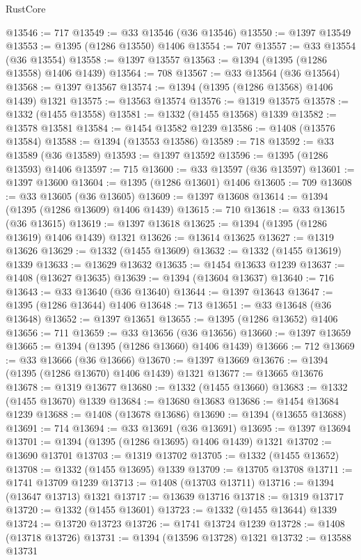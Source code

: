\begin{lexlean}{RustCore}
\begin{coremodule}
@13546 := 717
@13549 := @33 @13546 (@36 @13546)
@13550 := @1397 @13549
@13553 := @1395 (@1286 @13550) @1406
@13554 := 707
@13557 := @33 @13554 (@36 @13554)
@13558 := @1397 @13557
@13563 := @1394 (@1395 (@1286 @13558) @1406 @1439)
@13564 := 708
@13567 := @33 @13564 (@36 @13564)
@13568 := @1397 @13567
@13574 := @1394 (@1395 (@1286 @13568) @1406 @1439) @1321
@13575 := @13563 @13574
@13576 := @1319 @13575
@13578 := @1332 (@1455 @13558)
@13581 := @1332 (@1455 @13568) @1339
@13582 := @13578 @13581
@13584 := @1454 @13582 @1239
@13586 := @1408 (@13576 @13584)
@13588 := @1394 (@13553 @13586)
@13589 := 718
@13592 := @33 @13589 (@36 @13589)
@13593 := @1397 @13592
@13596 := @1395 (@1286 @13593) @1406
@13597 := 715
@13600 := @33 @13597 (@36 @13597)
@13601 := @1397 @13600
@13604 := @1395 (@1286 @13601) @1406
@13605 := 709
@13608 := @33 @13605 (@36 @13605)
@13609 := @1397 @13608
@13614 := @1394 (@1395 (@1286 @13609) @1406 @1439)
@13615 := 710
@13618 := @33 @13615 (@36 @13615)
@13619 := @1397 @13618
@13625 := @1394 (@1395 (@1286 @13619) @1406 @1439) @1321
@13626 := @13614 @13625
@13627 := @1319 @13626
@13629 := @1332 (@1455 @13609)
@13632 := @1332 (@1455 @13619) @1339
@13633 := @13629 @13632
@13635 := @1454 @13633 @1239
@13637 := @1408 (@13627 @13635)
@13639 := @1394 (@13604 @13637)
@13640 := 716
@13643 := @33 @13640 (@36 @13640)
@13644 := @1397 @13643
@13647 := @1395 (@1286 @13644) @1406
@13648 := 713
@13651 := @33 @13648 (@36 @13648)
@13652 := @1397 @13651
@13655 := @1395 (@1286 @13652) @1406
@13656 := 711
@13659 := @33 @13656 (@36 @13656)
@13660 := @1397 @13659
@13665 := @1394 (@1395 (@1286 @13660) @1406 @1439)
@13666 := 712
@13669 := @33 @13666 (@36 @13666)
@13670 := @1397 @13669
@13676 := @1394 (@1395 (@1286 @13670) @1406 @1439) @1321
@13677 := @13665 @13676
@13678 := @1319 @13677
@13680 := @1332 (@1455 @13660)
@13683 := @1332 (@1455 @13670) @1339
@13684 := @13680 @13683
@13686 := @1454 @13684 @1239
@13688 := @1408 (@13678 @13686)
@13690 := @1394 (@13655 @13688)
@13691 := 714
@13694 := @33 @13691 (@36 @13691)
@13695 := @1397 @13694
@13701 := @1394 (@1395 (@1286 @13695) @1406 @1439) @1321
@13702 := @13690 @13701
@13703 := @1319 @13702
@13705 := @1332 (@1455 @13652)
@13708 := @1332 (@1455 @13695) @1339
@13709 := @13705 @13708
@13711 := @1741 @13709 @1239
@13713 := @1408 (@13703 @13711)
@13716 := @1394 (@13647 @13713) @1321
@13717 := @13639 @13716
@13718 := @1319 @13717
@13720 := @1332 (@1455 @13601)
@13723 := @1332 (@1455 @13644) @1339
@13724 := @13720 @13723
@13726 := @1741 @13724 @1239
@13728 := @1408 (@13718 @13726)
@13731 := @1394 (@13596 @13728) @1321
@13732 := @13588 @13731

\end{coremodule}
\end{lexlean}
